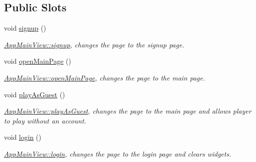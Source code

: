 \subsection*{Public Slots}
\begin{DoxyCompactItemize}
\item 
\mbox{\label{classAppMainView_a4b957db57f6eb234151b7569d7290a43}} 
void \hyperlink{classAppMainView_a4b957db57f6eb234151b7569d7290a43}{signup} ()
\begin{DoxyCompactList}\small\item\em \hyperlink{classAppMainView_a4b957db57f6eb234151b7569d7290a43}{App\+Main\+View\+::signup}, changes the page to the signup page. \end{DoxyCompactList}\item 
\mbox{\label{classAppMainView_ac195b1ff1ef242180c9adf634f39ea1f}} 
void \hyperlink{classAppMainView_ac195b1ff1ef242180c9adf634f39ea1f}{open\+Main\+Page} ()
\begin{DoxyCompactList}\small\item\em \hyperlink{classAppMainView_ac195b1ff1ef242180c9adf634f39ea1f}{App\+Main\+View\+::open\+Main\+Page}, changes the page to the main page. \end{DoxyCompactList}\item 
\mbox{\label{classAppMainView_a13520db5cb1b50330e79b71d14563a05}} 
void \hyperlink{classAppMainView_a13520db5cb1b50330e79b71d14563a05}{play\+As\+Guest} ()
\begin{DoxyCompactList}\small\item\em \hyperlink{classAppMainView_a13520db5cb1b50330e79b71d14563a05}{App\+Main\+View\+::play\+As\+Guest}, changes the page to the main page and allows player to play without an account. \end{DoxyCompactList}\item 
\mbox{\label{classAppMainView_adbde7b357c0307752ff7f1ddf7f28676}} 
void \hyperlink{classAppMainView_adbde7b357c0307752ff7f1ddf7f28676}{login} ()
\begin{DoxyCompactList}\small\item\em \hyperlink{classAppMainView_adbde7b357c0307752ff7f1ddf7f28676}{App\+Main\+View\+::login}, changes the page to the login page and clears widgets. \end{DoxyCompactList}\item 

\end{DoxyCompactItemize}
